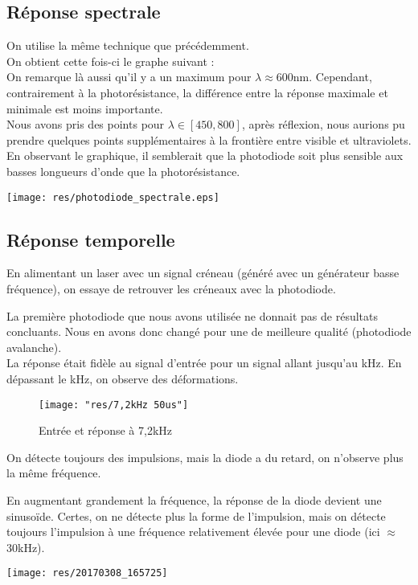 \documentclass[12pt,a4paper]{article}
\begin{document}
	\subsection{Réponse spectrale}
	On utilise la même technique que précédemment.\\
	On obtient cette fois-ci le graphe suivant :\\
	On remarque là aussi qu'il y a un maximum pour $\lambda\approx600$nm. Cependant, contrairement à la photorésistance, la différence entre la réponse maximale et minimale est moins importante.\\
	Nous avons pris des points pour $\lambda \in \left[450,800\right]$, après réflexion, nous  aurions pu prendre quelques points supplémentaires à la frontière entre visible et ultraviolets.\\
	En observant le graphique, il semblerait que la photodiode soit plus sensible aux basses longueurs d'onde que la photorésistance.
	\begin{center}
		\texttt{[image: res/photodiode\_spectrale.eps]}
	\end{center}
	\subsection{Réponse temporelle}
	En alimentant un laser avec un signal créneau (généré avec un générateur basse fréquence), on essaye de retrouver les créneaux avec la photodiode.
	
	
	La première photodiode que nous avons utilisée ne donnait pas de résultats concluants.
	Nous en avons donc changé pour une de meilleure qualité (photodiode avalanche).\\
	La réponse était fidèle au signal d'entrée pour un signal allant jusqu'au kHz.
	En dépassant le kHz, on observe des déformations.  
	\begin{figure}[h]
		\centering
		\texttt{[image: "res/7,2kHz 50us"]}
		\caption{Entrée et réponse à 7,2kHz}
		\label{fig:72khz-50us}
	\end{figure}
	On détecte toujours des impulsions, mais la diode a du retard, on n'observe plus la même fréquence.
	
	En augmentant grandement la fréquence, la réponse de la diode devient une sinusoïde. Certes, on ne détecte plus la forme de l'impulsion, mais on détecte toujours l'impulsion à une fréquence relativement élevée pour une diode (ici $\approx$30kHz). 
	\begin{center}
		\texttt{[image: res/20170308\_165725]}
	\end{center}
\end{document}

